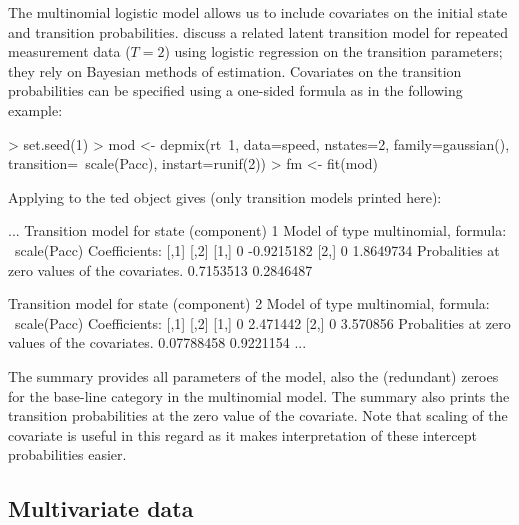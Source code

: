 \documentclass[article]{jss}
\begin{document}
The multinomial logistic model allows us to include covariates 
on the initial state and transition probabilities. \citet{Chung2007} discuss a 
related latent transition model for repeated measurement
data ($T=2$) using logistic regression on the transition 
parameters; they rely on Bayesian methods of estimation. 
Covariates on the transition probabilities can be specified using a
one-sided formula as in the following example:
\begin{CodeChunk}
\begin{CodeInput}
> set.seed(1)
> mod <- depmix(rt~1, data=speed, nstates=2, family=gaussian(), 
    transition=~scale(Pacc), instart=runif(2))
> fm <- fit(mod)
\end{CodeInput}
\end{CodeChunk}

Applying  to the ted object gives (only transition models
printed here): 
\begin{CodeChunk}
\begin{CodeOutput}
...
Transition model for state (component) 1 
Model of type multinomial, formula: ~scale(Pacc)
Coefficients: 
     [,1]       [,2]
[1,]    0 -0.9215182
[2,]    0  1.8649734
Probalities at zero values of the covariates.
0.7153513 0.2846487 

Transition model for state (component) 2 
Model of type multinomial, formula: ~scale(Pacc)
Coefficients: 
     [,1]     [,2]
[1,]    0 2.471442
[2,]    0 3.570856
Probalities at zero values of the covariates.
0.07788458 0.9221154
...
\end{CodeOutput}
\end{CodeChunk}
The summary provides all parameters of the model, also the 
(redundant) zeroes for the base-line category in the multinomial model. 
The summary also prints the transition probabilities
at the zero value of the covariate. Note that scaling of the covariate 
is useful in this regard as it makes interpretation of these intercept probabilities 
easier. 

\subsection{Multivariate data}
\end{document}
